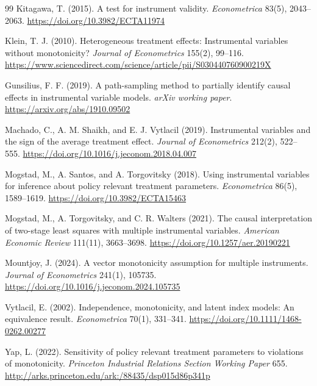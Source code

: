 \documentclass[11pt]{article}
\theoremstyle{definition}
\theoremstyle{plain}
\theoremstyle{remark}
\begin{document}
\begin{thebibliography}{99}
Kitagawa, T. (2015).
A test for instrument validity.
\emph{Econometrica} 83(5), 2043--2063.
\url{https://doi.org/10.3982/ECTA11974}

Klein, T. J. (2010).
Heterogeneous treatment effects: Instrumental variables without monotonicity?
\emph{Journal of Econometrics} 155(2), 99--116.
\url{https://www.sciencedirect.com/science/article/pii/S030440760900219X}

Gunsilius, F. F. (2019).
A path-sampling method to partially identify causal effects in instrumental variable models.
\emph{arXiv working paper}.
\url{https://arxiv.org/abs/1910.09502}

Machado, C., A. M. Shaikh, and E. J. Vytlacil (2019).
Instrumental variables and the sign of the average treatment effect.
\emph{Journal of Econometrics} 212(2), 522--555.
\url{https://doi.org/10.1016/j.jeconom.2018.04.007}

Mogstad, M., A. Santos, and A. Torgovitsky (2018).
Using instrumental variables for inference about policy relevant treatment parameters.
\emph{Econometrica} 86(5), 1589--1619.
\url{https://doi.org/10.3982/ECTA15463}

Mogstad, M., A. Torgovitsky, and C. R. Walters (2021).
The causal interpretation of two-stage least squares with multiple instrumental variables.
\emph{American Economic Review} 111(11), 3663--3698.
\url{https://doi.org/10.1257/aer.20190221}

Mountjoy, J. (2024).
A vector monotonicity assumption for multiple instruments.
\emph{Journal of Econometrics} 241(1), 105735.
\url{https://doi.org/10.1016/j.jeconom.2024.105735}

Vytlacil, E. (2002).
Independence, monotonicity, and latent index models: An equivalence result.
\emph{Econometrica} 70(1), 331--341.
\url{https://doi.org/10.1111/1468-0262.00277}

Yap, L. (2022).
Sensitivity of policy relevant treatment parameters to violations of monotonicity.
\emph{Princeton Industrial Relations Section Working Paper} 655.
\url{http://arks.princeton.edu/ark:/88435/dsp015d86p341p}
\end{thebibliography}
\end{document}

